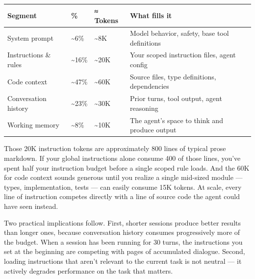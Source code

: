 \documentclass[
  a4paper,
  DIV=11,
  numbers=noendperiod]{scrreprt}
\newcounter{none} %
\begin{document}
{\def\LTcaptype{none} %
\begin{longtable}[]{@{}
  >{\raggedright\arraybackslash}p{}
  >{\raggedright\arraybackslash}p{}
  >{\raggedright\arraybackslash}p{}
  >{\raggedright\arraybackslash}p{}@{}}
\toprule\noalign{}
\begin{minipage}[b]{\linewidth}\raggedright
Segment
\end{minipage} & \begin{minipage}[b]{\linewidth}\raggedright
\%
\end{minipage} & \begin{minipage}[b]{\linewidth}\raggedright
≈ Tokens
\end{minipage} & \begin{minipage}[b]{\linewidth}\raggedright
What fills it
\end{minipage} \\
\midrule\noalign{}
\endhead
\bottomrule\noalign{}
\endlastfoot
System prompt & \textasciitilde6\% & \textasciitilde8K & Model behavior,
safety, base tool definitions \\
Instructions \& rules & \textasciitilde16\% & \textasciitilde20K & Your
scoped instruction files, agent config \\
Code context & \textasciitilde47\% & \textasciitilde60K & Source files,
type definitions, dependencies \\
Conversation history & \textasciitilde23\% & \textasciitilde30K & Prior
turns, tool output, agent reasoning \\
Working memory & \textasciitilde8\% & \textasciitilde10K & The agent's
space to think and produce output \\
\end{longtable}
}

Those 20K instruction tokens are approximately 800 lines of typical
prose markdown. If your global instructions alone consume 400 of those
lines, you've spent half your instruction budget before a single scoped
rule loads. And the 60K for code context sounds generous until you
realize a single mid-sized module --- types, implementation, tests ---
can easily consume 15K tokens. At scale, every line of instruction
competes directly with a line of source code the agent could have seen
instead.

Two practical implications follow. First, shorter sessions produce
better results than longer ones, because conversation history consumes
progressively more of the budget. When a session has been running for 30
turns, the instructions you set at the beginning are competing with
pages of accumulated dialogue. Second, loading instructions that aren't
relevant to the current task is not neutral --- it actively degrades
performance on the task that matters.
\end{document}
